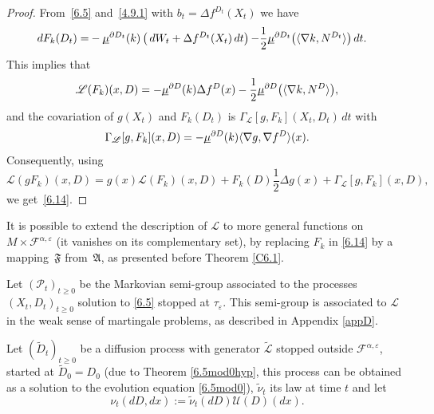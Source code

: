 \documentclass[10pt]{amsart}
\theoremstyle{plain}
\theoremstyle{definition}
\newcommand{\SL}{{\mathscr L}}
\newcommand{\SP}{{\mathscr P}}
\newcommand{\SU}{{\mathscr U}}
\newcommand{\usm}{{\underline{\smash{\mu}}}}
\let\f\frac
\let\a\alpha
\let\D\Delta
\let\e\varepsilon
\let\n\nabla
\let\wi\widetilde
\newcommand{\cF}{\mathcal{F}}
\newcommand{\fA}{\mathfrak{A}}
\newcommand{\fF}{\mathfrak{F}}
\begin{document}
\begin{proof}
From~\eqref{6.5} and~\eqref{4.9.1} with $b_t=\D f^{D_t}(X_t)$ we have
\begin{equation}
\begin{split}
dF_k(D_t)=&-\usm^{\partial D_t}(k)\left(\,dW_t +\D f^{D_t}(X_t)\,dt\right){-}\f12\usm^{\partial D_t}\bigl(\langle \n k,N^{D_t}\rangle \bigr)\,dt.
\end{split}
\end{equation}
This implies that
\begin{equation}
\SL(F_k)(x,D)=-\usm^{\partial D}(k)\D f^D(x)-\f12\usm^{\partial D}\bigl(\langle \n k,N^{D}\rangle \bigr),
\end{equation}
and the covariation of $g(X_t)$ and $F_k(D_t)$ is $\Gamma_\SL[g,F_k](X_t,D_t)\,dt$ with
\begin{equation}
\Gamma_\SL[g,F_k](x,D)=-\usm^{\partial D}(k)\langle \n g,\n f^D\rangle (x).
\end{equation}
Consequently, using
\begin{equation}
\SL(gF_k)(x,D)= g(x)\SL(F_k)(x,D)+F_k(D)\f12\D g(x)+\Gamma_\SL[g,F_k](x,D),
\end{equation}
we get~\eqref{6.14}.
\end{proof}
\par
It is possible to extend the description of $\SL$ to more general functions on $M\times\cF^{\a,\e}$ (it vanishes on its complementary set), by replacing $F_k$ in \eqref{6.14} by a mapping~$\fF$ from~$\fA$, as presented before Theorem \ref{C6.1}.\par
Let $(\SP_t)_{t\geq 0}$ be the Markovian semi-group associated to the processes $(X_t,D_t)_{t\geq 0}$ solution to \eqref{6.5} stopped at $\tau_\e$.
This semi-group is associated to $\SL$ in the weak sense of martingale problems, as described in Appendix \ref{appD}.
\par
Let $(\wi D_t)_{t\geq 0}$ be a diffusion process with generator $ \wi\SL$ stopped outside $\cF^{\a,\e}$,
started at $\wi D_0=D_0$ (due to Theorem \ref{6.5mod0hyp}, this process can be obtained as a solution to the evolution equation \eqref{6.5mod0}),
$\wi \nu_t$ its law at time $t$ and let
\begin{equation}
\nu_t(dD, dx):=\wi \nu_t(dD)\SU(D)(dx).
\end{equation}
\end{document}
